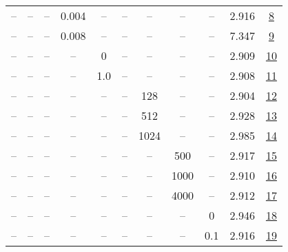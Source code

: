 \begin{table}[H]
\begin{tabular}{ccccccccccc}
-- & -- & -- & 0.004 & -- & -- & -- & -- & -- & 2.916 & \href{https://wandb.ai/stanford-mercury/optimizer-scaling/runs/sweep-1.2b-24B-adamw1edd23lr0.004-wd0.2-minlr0.0-warmup2000-b10.-92a750}{8} \\
-- & -- & -- & 0.008 & -- & -- & -- & -- & -- & 7.347 & \href{https://wandb.ai/stanford-mercury/optimizer-scaling/runs/sweep-1.2b-24B-adamw4476fflr0.008-wd0.2-minlr0-warmup2000-b10.9--5acee7}{9} \\
-- & -- & -- & -- & 0 & -- & -- & -- & -- & 2.909 & \href{https://wandb.ai/stanford-mercury/optimizer-scaling/runs/sweep-1.2b-24B-adamw6b42falr0.002-wd0.2-minlr0-warmup2000-b10.9--cddeaa}{10} \\
-- & -- & -- & -- & 1.0 & -- & -- & -- & -- & 2.908 & \href{https://wandb.ai/stanford-mercury/optimizer-scaling/runs/sweep-1.2b-24B-adamw9d306elr0.002-wd0.2-minlr0-warmup2000-b10.9--c16926}{11} \\
-- & -- & -- & -- & -- & -- & 128 & -- & -- & 2.904 & \href{https://wandb.ai/stanford-mercury/optimizer-scaling/runs/sweep-1.2b-24B-adamwc221ealr0.002-wd0.2-minlr0-warmup2000-b10.9--d14fe4}{12} \\
-- & -- & -- & -- & -- & -- & 512 & -- & -- & 2.928 & \href{https://wandb.ai/stanford-mercury/optimizer-scaling/runs/sweep-1.2b-24B-adamwb10b19lr0.002-wd0.2-minlr0-warmup2000-b10.9--2fcef1}{13} \\
-- & -- & -- & -- & -- & -- & 1024 & -- & -- & 2.985 & \href{https://wandb.ai/stanford-mercury/optimizer-scaling/runs/sweep-1.2b-24B-adamwf0dd70lr0.002-wd0.2-minlr0-warmup2000-b10.9--751ff8}{14} \\
-- & -- & -- & -- & -- & -- & -- & 500 & -- & 2.917 & \href{https://wandb.ai/stanford-mercury/optimizer-scaling/runs/sweep-1.2b-24B-adamw82e04dlr0.002-wd0.2-minlr0-warmup500-b10.9-b-4a7d30}{15} \\
-- & -- & -- & -- & -- & -- & -- & 1000 & -- & 2.910 & \href{https://wandb.ai/stanford-mercury/optimizer-scaling/runs/sweep-1.2b-24B-adamw613e35lr0.002-wd0.2-minlr0.0-warmup1000.0-b1-25ef51}{16} \\
-- & -- & -- & -- & -- & -- & -- & 4000 & -- & 2.912 & \href{https://wandb.ai/stanford-mercury/optimizer-scaling/runs/sweep-1.2b-24B-adamwf0120blr0.002-wd0.2-minlr0-warmup4000-b10.9--72e36e}{17} \\
-- & -- & -- & -- & -- & -- & -- & -- & 0 & 2.946 & \href{https://wandb.ai/stanford-mercury/optimizer-scaling/runs/sweep-1.2b-24B-adamw400796lr0.002-wd0-minlr0-warmup2000-b10.9-b2-78071b}{18} \\
-- & -- & -- & -- & -- & -- & -- & -- & 0.1 & 2.916 & \href{https://wandb.ai/stanford-mercury/optimizer-scaling/runs/sweep-1.2b-24B-adamw8fd298lr0.002-wd0.1-minlr0-warmup2000-b10.9--2ccc79}{19} \\
\bottomrule
\end{tabular}
\end{table}

